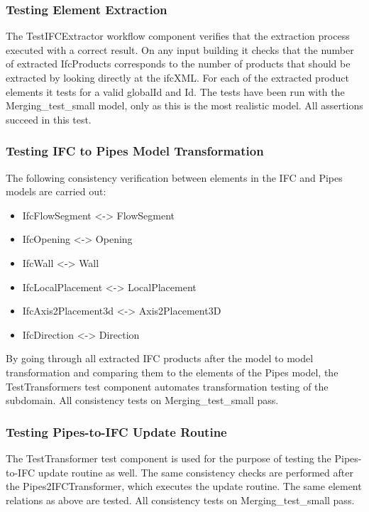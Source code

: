 \subsubsection{Testing Element Extraction}
The TestIFCExtractor workflow component verifies that the extraction process executed with a correct result. On any input building it checks that the number of extracted IfcProducts corresponds to the number of products that should be extracted by looking directly at the ifcXML. For each of the extracted product elements it tests for a valid globalId and Id. The tests have been run with the Merging\_{}test\_{}small model, only as this is the most realistic model. All assertions succeed in this test.

\subsubsection{Testing IFC to Pipes Model Transformation}
The following consistency verification between elements in the IFC and Pipes models are carried out:

\begin{itemize}
	\item IfcFlowSegment <-> FlowSegment
	\item IfcOpening <-> Opening
	\item IfcWall <-> Wall
	\item IfcLocalPlacement <-> LocalPlacement
	\item IfcAxis2Placement3d <-> Axis2Placement3D
	\item IfcDirection <-> Direction
\end{itemize}

By going through all extracted IFC products after the model to model transformation and comparing them to the elements of the Pipes model, the TestTransformers test component automates transformation testing of the subdomain. All consistency tests on Merging\_{}test\_{}small pass.

\subsubsection{Testing Pipes-to-IFC Update Routine}
The TestTransformer test component is used for the purpose of testing the Pipes-to-IFC update routine as well. The same consistency checks are performed after the Pipes2IFCTransformer, which executes the update routine. The same element relations as above are tested. All consistency tests on Merging\_{}test\_{}small pass.





